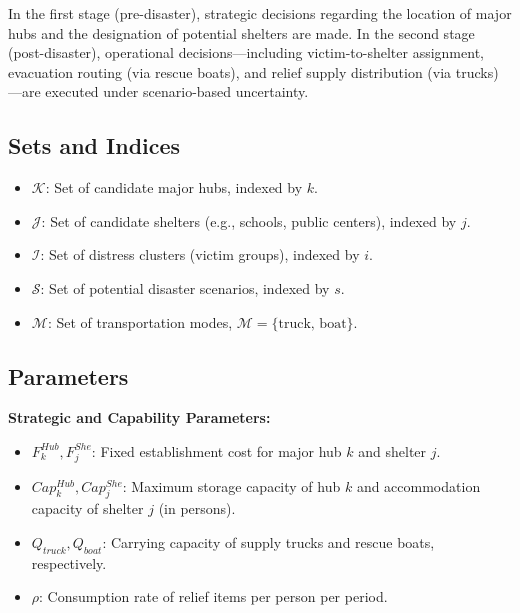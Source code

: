In the first stage (pre-disaster), strategic decisions regarding the location of major hubs and the designation of potential shelters are made. In the second stage (post-disaster), operational decisions—including victim-to-shelter assignment, evacuation routing (via rescue boats), and relief supply distribution (via trucks)—are executed under scenario-based uncertainty.

\subsection*{Sets and Indices}
\begin{itemize}
    \item $\mathcal{K}$: Set of candidate major hubs, indexed by $k$.
    \item $\mathcal{J}$: Set of candidate shelters (e.g., schools, public centers), indexed by $j$.
    \item $\mathcal{I}$: Set of distress clusters (victim groups), indexed by $i$.
    \item $\mathcal{S}$: Set of potential disaster scenarios, indexed by $s$.
    \item $\mathcal{M}$: Set of transportation modes, $\mathcal{M} = \{ \text{truck, boat} \}$.
\end{itemize}

\subsection*{Parameters}

\textbf{Strategic and Capability Parameters:}
\begin{itemize}
    \item $F_k^{Hub}, F_j^{She}$: Fixed establishment cost for major hub $k$ and shelter $j$.
    \item $Cap_k^{Hub}, Cap_j^{She}$: Maximum storage capacity of hub $k$ and accommodation capacity of shelter $j$ (in persons).
    \item $Q_{truck}, Q_{boat}$: Carrying capacity of supply trucks and rescue boats, respectively.
    \item $\rho$: Consumption rate of relief items per person per period.
\end{itemize}

